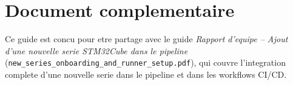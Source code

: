 \documentclass[11pt,a4paper]{article}
\begin{document}
\section{Document complementaire}
Ce guide est concu pour etre partage avec le guide
\emph{Rapport d'equipe -- Ajout d'une nouvelle serie STM32Cube dans le pipeline}
(\texttt{new\_series\_onboarding\_and\_runner\_setup.pdf}), qui couvre l'integration
complete d'une nouvelle serie dans le pipeline et dans les workflows CI/CD.
\end{document}
